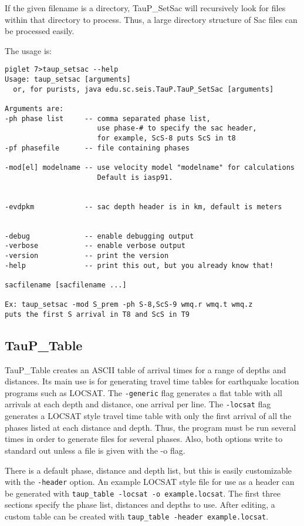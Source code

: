 If the given filename is a directory, TauP\_SetSac will recursively look for files within that directory to process. Thus,
a large directory structure of Sac files can be processed easily.

The usage is:
\begin{verbatim}
piglet 7>taup_setsac --help
Usage: taup_setsac [arguments]
  or, for purists, java edu.sc.seis.TauP.TauP_SetSac [arguments]

Arguments are:
-ph phase list     -- comma separated phase list,
                      use phase-# to specify the sac header,
                      for example, ScS-8 puts ScS in t8
-pf phasefile      -- file containing phases

-mod[el] modelname -- use velocity model "modelname" for calculations
                      Default is iasp91.


-evdpkm            -- sac depth header is in km, default is meters


-debug             -- enable debugging output
-verbose           -- enable verbose output
-version           -- print the version
-help              -- print this out, but you already know that!

sacfilename [sacfilename ...]

Ex: taup_setsac -mod S_prem -ph S-8,ScS-9 wmq.r wmq.t wmq.z
puts the first S arrival in T8 and ScS in T9
\end{verbatim} 

\subsection{TauP\_Table}

TauP\_Table creates an ASCII table of arrival times for a range of depths and
distances. Its main use is for generating travel time tables for earthquake
location programs such as LOCSAT. The \texttt{-generic} flag generates a flat
table with all arrivals at each depth and distance, one arrival per line.
The \texttt{-locsat} flag generates a LOCSAT style travel time table with
only the first arrival of all the phases listed at each distance and depth.
Thus, the program must be run several times in order to generate files for 
several phases. Also, both options write to standard out unless a file is
given with the -o flag.

There is a default phase, distance and depth list, but this is easily 
customizable with the \texttt{-header} option. An example LOCSAT style 
file for use as a header can be generated with 
\texttt{taup\_table -locsat -o example.locsat}. The first 
three sections specify the phase list, distances and depths to use. 
After editing, a custom table can be created with 
\texttt{taup\_table -header example.locsat}.

